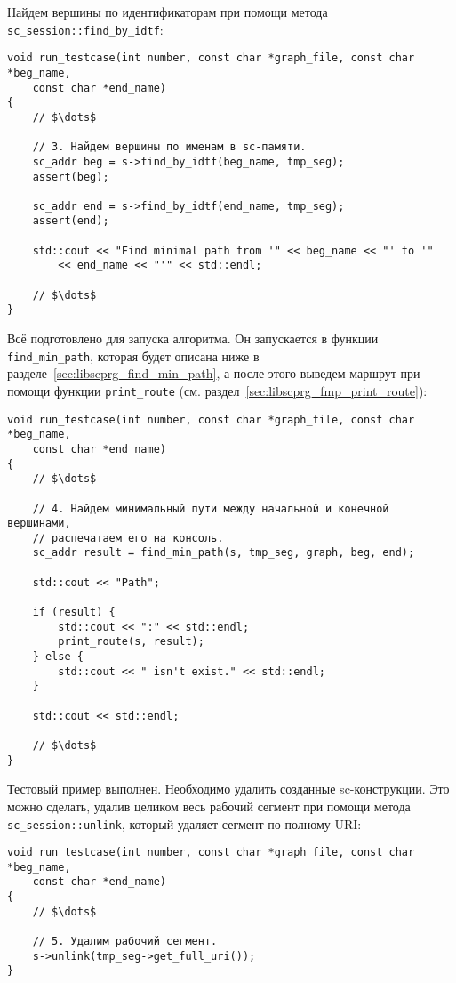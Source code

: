 Найдем вершины по идентификаторам при помощи метода
\lstinline|sc_session::find_by_idtf|:
\begin{lstlisting}[texcl]
void run_testcase(int number, const char *graph_file, const char *beg_name,
    const char *end_name)
{
    // $\dots$

    // 3. Найдем вершины по именам в sc-памяти.
    sc_addr beg = s->find_by_idtf(beg_name, tmp_seg);
    assert(beg);

    sc_addr end = s->find_by_idtf(end_name, tmp_seg);
    assert(end);

    std::cout << "Find minimal path from '" << beg_name << "' to '"
        << end_name << "'" << std::endl;

    // $\dots$
}
\end{lstlisting}

Всё подготовлено для запуска алгоритма. Он запускается в функции
\lstinline|find_min_path|, которая будет описана ниже в
разделе~\ref{sec:libscprg_find_min_path}, а после этого выведем
маршрут при помощи функции \lstinline|print_route|
(см. раздел~\ref{sec:libscprg_fmp_print_route}):
\begin{lstlisting}[texcl]
void run_testcase(int number, const char *graph_file, const char *beg_name,
    const char *end_name)
{
    // $\dots$

    // 4. Найдем минимальный пути между начальной и конечной вершинами,
    // распечатаем его на консоль.
    sc_addr result = find_min_path(s, tmp_seg, graph, beg, end);

    std::cout << "Path";

    if (result) {
        std::cout << ":" << std::endl;
        print_route(s, result);
    } else {
        std::cout << " isn't exist." << std::endl;
    }

    std::cout << std::endl;

    // $\dots$
}
\end{lstlisting}

Тестовый пример выполнен. Необходимо удалить созданные
sc-конструкции. Это можно сделать, удалив целиком весь рабочий сегмент
при помощи метода \lstinline|sc_session::unlink|, который удаляет
сегмент по полному URI:
\begin{lstlisting}[texcl]
void run_testcase(int number, const char *graph_file, const char *beg_name,
    const char *end_name)
{
    // $\dots$

    // 5. Удалим рабочий сегмент.
    s->unlink(tmp_seg->get_full_uri());
}
\end{lstlisting}

